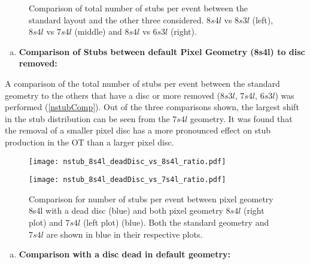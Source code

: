 \begin{figure}[H]
    \centering
     \caption{Comparison of total number of stubs per event between the standard layout and the other three considered. $8s4l$ vs $8s3l$ (left), $8s4l$ vs $7s4l$ (middle) and $8s4l$ vs $6s3l$ (right).}
\label{nstubComp}
\end{figure}

\vspace{1em}

\begin{enumerate}[(a),resume]	
	\item{\textbf{Comparison of Stubs between default Pixel Geometry (8s4l) to disc removed:}}
\end{enumerate}

A comparison of the total number of stubs per event between the standard geometry to the others that have a disc or more removed ($8s3l$, $7s4l$, $6s3l$) was performed (\autoref{nstubComp}). Out of the three comparisons shown, the largest shift in the stub distribution can be seen from the $7s4l$ geometry. It was found that the removal of a smaller pixel disc has a more pronounced effect on stub production in the OT than a larger pixel disc.\\

\begin{figure}[H]
\begin{center}
\begin{minipage}[b]{0.45\textwidth}
\texttt{[image: nstub\_8s4l\_deadDisc\_vs\_8s4l\_ratio.pdf]} 
\end{minipage}
\hspace{1em}
\begin{minipage}[b]{0.45\textwidth}
\texttt{[image: nstub\_8s4l\_deadDisc\_vs\_7s4l\_ratio.pdf]} 
\end{minipage}
\caption{Comparison for number of stubs per event between pixel geometry 8s4l with a dead disc (blue) and both pixel geometry $8s4l$ (right plot) and $7s4l$ (left plot) (blue). Both the standard geometry and $7s4l$ are shown in blue in their respective plots.}
\label{nstubdeadDisc} 
\end{center}
\end{figure}

\begin{enumerate}[(a),resume]
\item{\textbf{Comparison with a disc dead in default geometry:}}
\end{enumerate}


